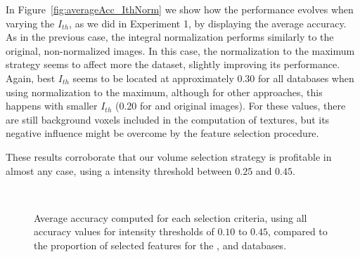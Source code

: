 In Figure~\ref{fig:averageAcc_IthNorm} we show how the performance evolves when varying the $I_{th}$, as we did in Experiment 1, by displaying the average accuracy. As in the previous case, the integral normalization performs similarly to the original, non-normalized images. In this case, the normalization to the maximum strategy seems to affect more the \vdlvdat{} dataset, slightly improving its performance. Again, best $I_{th}$ seems to be located at approximately 0.30 for all databases when using normalization to the maximum, although for other approaches, this happens with smaller $I_{th}$ (0.20 for \vdlvdat{} and \vdlvdat{} original images). For these values, there are still background voxels included in the computation of textures, but its negative influence might be overcome by the feature selection procedure. 

These results corroborate that our volume selection strategy is profitable in almost any case, using a intensity threshold between $0.25$ and $0.45$. 

\begin{figure}
	\centering
	\\
	\caption[Average accuracy computed for each selection criteria over $N$ in Experiment 2.]{Average accuracy computed for each selection criteria, using all accuracy values for intensity thresholds of $0.10$ to $0.45$, compared to the proportion of selected features for the \ppmidat{}, \vdlvdat{} and \vdlvdat{}{} databases.}
	\label{fig:experiment4}
\end{figure}

